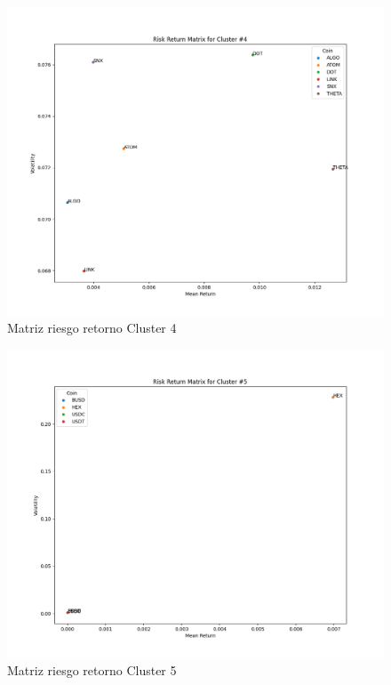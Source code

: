 \documentclass[runningheads,legalpaper,10pt]{etc/llncs}
\begin{document}
\begin{figure}[htp]
    \centering
    \includegraphics[scale=0.5]{images/cluster_4.png}
    \caption{Matriz riesgo retorno Cluster 4}
    \label{fig:cluster_4}
\end{figure}

\begin{figure}[htp]
    \centering
    \includegraphics[scale=0.5]{images/cluster_5.png}
    \caption{Matriz riesgo retorno Cluster 5}
    \label{fig:cluster_5}
\end{figure}
\end{document}
